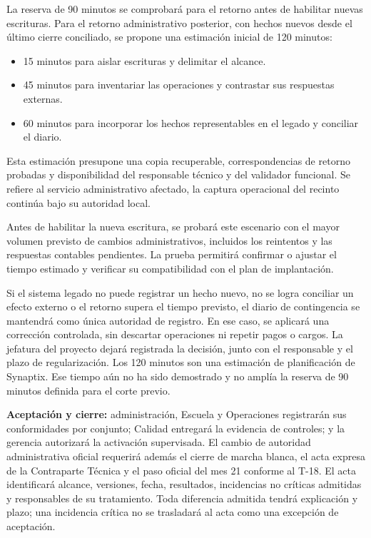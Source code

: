 La reserva de 90 minutos se comprobará para el retorno antes de habilitar nuevas escrituras. Para el retorno administrativo posterior, con hechos nuevos desde el último cierre conciliado, se propone una estimación inicial de 120 minutos:
\begin{itemize}
    \item 15 minutos para aislar escrituras y delimitar el alcance.
    \item 45 minutos para inventariar las operaciones y contrastar sus respuestas externas.
    \item 60 minutos para incorporar los hechos representables en el legado y conciliar el diario.
\end{itemize}

Esta estimación presupone una copia recuperable, correspondencias de retorno probadas y disponibilidad del responsable técnico y del validador funcional. Se refiere al servicio administrativo afectado, la captura operacional del recinto continúa bajo su autoridad local.

Antes de habilitar la nueva escritura, se probará este escenario con el mayor volumen previsto de cambios administrativos, incluidos los reintentos y las respuestas contables pendientes. La prueba permitirá confirmar o ajustar el tiempo estimado y verificar su compatibilidad con el plan de implantación.

Si el sistema legado no puede registrar un hecho nuevo, no se logra conciliar un efecto externo o el retorno supera el tiempo previsto, el diario de contingencia se mantendrá como única autoridad de registro. En ese caso, se aplicará una corrección controlada, sin descartar operaciones ni repetir pagos o cargos. La jefatura del proyecto dejará registrada la decisión, junto con el responsable y el plazo de regularización. Los 120 minutos son una estimación de planificación de Synaptix. Ese tiempo aún no ha sido demostrado y no amplía la reserva de 90 minutos definida para el corte previo.

\textbf{Aceptación y cierre:} administración, Escuela y Operaciones registrarán sus conformidades por conjunto; Calidad entregará la evidencia de controles; y la gerencia autorizará la activación supervisada. El cambio de autoridad administrativa oficial requerirá además el cierre de marcha blanca, el acta expresa de la Contraparte Técnica y el paso oficial del mes 21 conforme al T-18. El acta identificará alcance, versiones, fecha, resultados, incidencias no críticas admitidas y responsables de su tratamiento. Toda diferencia admitida tendrá explicación y plazo; una incidencia crítica no se trasladará al acta como una excepción de aceptación.

